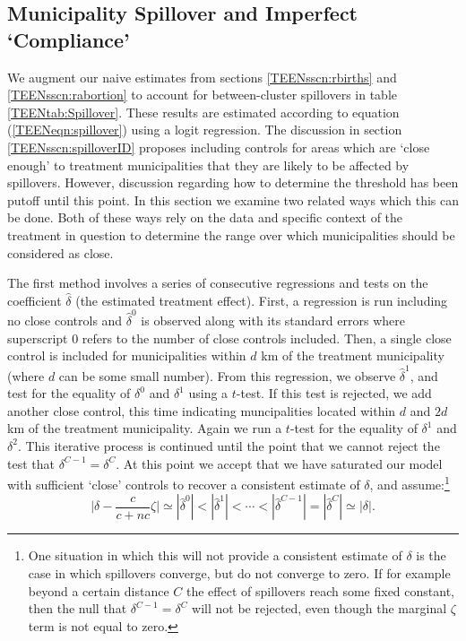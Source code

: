 \subsection{Municipality Spillover and Imperfect `Compliance'}
\label{TEENsscn:spillover}
We augment our naive estimates from sections \ref{TEENsscn:rbirths} and
\ref{TEENsscn:rabortion} to account for between-cluster spillovers in table
\ref{TEENtab:Spillover}.  These results are estimated according to equation
(\ref{TEENeqn:spillover}) using a logit regression.  The discussion in section
\ref{TEENsscn:spilloverID} proposes including controls for areas which are `close 
enough' to treatment municipalities that they are likely to be affected by
spillovers.  However, discussion regarding how to determine the threshold has
been putoff until this point. In this section we examine two related ways which 
this can be done.  Both of these ways rely on the data and specific context 
of the treatment in question to determine the range over which municipalities 
should be considered as close.

The first method involves a series of consecutive regressions and tests on the
coefficient $\widehat\delta$ (the estimated treatment effect).  First, a 
regression is run including no close
controls and $\hat\delta^0$ is observed along with its standard errors where 
superscript 0 refers to the number of close controls included.  Then, a single
close control is included for municipalities within $d$ km of the treatment
municipality (where $d$ can be some small number).  From this regression, we
observe $\hat\delta^1$, and test for the equality of $\delta^0$  and $\delta^1$ 
using a $t$-test.  If this test is rejected, we add another close control, 
this time indicating muncipalities located within $d$ and $2d$ km of the 
treatment municipality.  Again we run a $t$-test for the equality of $\delta^1$ 
and $\delta^2$.  This iterative process is continued until the point that we 
cannot reject the test that $\delta^{C-1}=\delta^C$.  At this point we accept 
that we have saturated our model with sufficient `close' controls to recover 
a consistent estimate of $\delta$, and assume:\footnote{One situation in which 
this will not provide a consistent estimate of $\delta$ is the case in which 
spillovers converge, but do not converge to zero.  If for example beyond a 
certain distance $C$ the effect of spillovers reach some fixed constant, then 
the null that $\delta^{C-1}=\delta^C$ will not be rejected, even though the 
marginal $\zeta$ term is not equal to zero.}
\begin{equation}
\bigg|\delta-\frac{c}{c+nc}\zeta\bigg|\simeq|\hat\delta^0|<|\hat\delta^1|<\cdots<
|\hat\delta^{C-1}|=|\hat\delta^C|\simeq|\delta|.
\end{equation}

